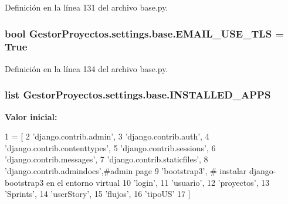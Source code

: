 Definición en la línea 131 del archivo base.\+py.

\subsubsection[{\texorpdfstring{E\+M\+A\+I\+L\+\_\+\+U\+S\+E\+\_\+\+T\+LS}{EMAIL_USE_TLS}}]{\setlength{\rightskip}{0pt plus 5cm}bool Gestor\+Proyectos.\+settings.\+base.\+E\+M\+A\+I\+L\+\_\+\+U\+S\+E\+\_\+\+T\+LS = True}\hypertarget{namespace_gestor_proyectos_1_1settings_1_1base_a9c69dc21cacf6ddc69ebc4eda6c32fb9}{}\label{namespace_gestor_proyectos_1_1settings_1_1base_a9c69dc21cacf6ddc69ebc4eda6c32fb9}


Definición en la línea 134 del archivo base.\+py.

\subsubsection[{\texorpdfstring{I\+N\+S\+T\+A\+L\+L\+E\+D\+\_\+\+A\+P\+PS}{INSTALLED_APPS}}]{\setlength{\rightskip}{0pt plus 5cm}list Gestor\+Proyectos.\+settings.\+base.\+I\+N\+S\+T\+A\+L\+L\+E\+D\+\_\+\+A\+P\+PS}\hypertarget{namespace_gestor_proyectos_1_1settings_1_1base_aa6993132a93e138a35d70e714dc5d0e9}{}\label{namespace_gestor_proyectos_1_1settings_1_1base_aa6993132a93e138a35d70e714dc5d0e9}
{\bfseries Valor inicial\+:}
\begin{DoxyCode}
1 = [
2     \textcolor{stringliteral}{'django.contrib.admin'},
3     \textcolor{stringliteral}{'django.contrib.auth'},
4     \textcolor{stringliteral}{'django.contrib.contenttypes'},
5     \textcolor{stringliteral}{'django.contrib.sessions'},
6     \textcolor{stringliteral}{'django.contrib.messages'},
7     \textcolor{stringliteral}{'django.contrib.staticfiles'},
8     \textcolor{stringliteral}{'django.contrib.admindocs'},\textcolor{comment}{#admin page}
9     \textcolor{stringliteral}{'bootstrap3'}, \textcolor{comment}{# instalar django-bootstrap3 en el entorno virtual}
10     \textcolor{stringliteral}{'login'},
11     \textcolor{stringliteral}{'usuario'},
12     \textcolor{stringliteral}{'proyectos'},
13     \textcolor{stringliteral}{'Sprints'},
14     \textcolor{stringliteral}{'userStory'},
15     \textcolor{stringliteral}{'flujos'},
16     \textcolor{stringliteral}{'tipoUS'}
17 ]
\end{DoxyCode}


